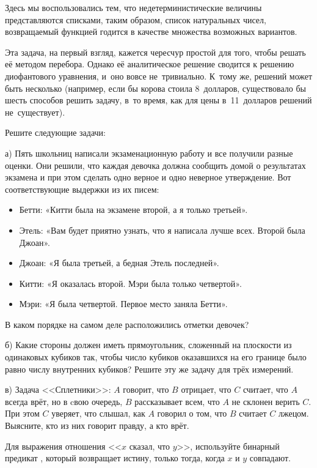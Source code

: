 Здесь мы воспользовались тем, что недетерминистические величины представляются списками, таким образом, список натуральных чисел, возвращаемый функцией  годится в качестве множества возможных вариантов.

Эта задача, на первый взгляд, кажется чересчур простой для того, чтобы решать её методом перебора. Однако её аналитическое решение сводится к решению диофантового уравнения, и~оно вовсе не~тривиально. К~тому же, решений может быть несколько (например, если бы корова стоила 8~долларов, существовало бы шесть способов решить задачу, в~то время, как для цены в~11~долларов решений не~существует).

\newpage
\begin{Assignment}
Решите следующие задачи:

\medskip
а) Пять школьниц написали экзаменационную работу и все получили разные оценки. Они решили, что каждая девочка должна сообщить домой о результатах экзамена и при этом сделать одно верное и
одно неверное утверждение. Вот соответствующие выдержки из их писем:
\begin{itemize}
  \item Бетти: «Китти была на экзамене второй, а я только третьей».
  \item Этель: «Вам будет приятно узнать, что я написала лучше всех. Второй была Джоан».
  \item Джоан: «Я была третьей, а бедная Этель последней».
  \item Китти: «Я оказалась второй. Мэри была только четвертой».
  \item Мэри: «Я была четвертой. Первое место заняла Бетти».
\end{itemize}
 В каком порядке на самом деле расположились отметки девочек?
 
 \medskip
 б)\label{as:rectangles} Какие стороны должен иметь прямоугольник, сложенный на плоскости из одинаковых кубиков так, чтобы число кубиков оказавшихся на его границе было равно числу внутренних кубиков? Решите эту же задачу для трёх измерений.

  \medskip
 в) Задача <<Сплетники>>: $A$ говорит, что $B$ отрицает, что $C$ считает, что $A$ всегда врёт, но в cвою очередь, $B$ рассказывает всем, что $A$ не склонен верить $C$. При этом $C$ уверяет, что слышал, как $A$ говорил о том, что $B$ считает $C$ лжецом. Выясните, кто из них говорит правду, а кто врёт.
 
 Для выражения отношения <<$x$ сказал, что $y$>>, используйте бинарный предикат , который возвращает истину, только тогда, когда $x$ и $y$ совпадают.
\end{Assignment}


